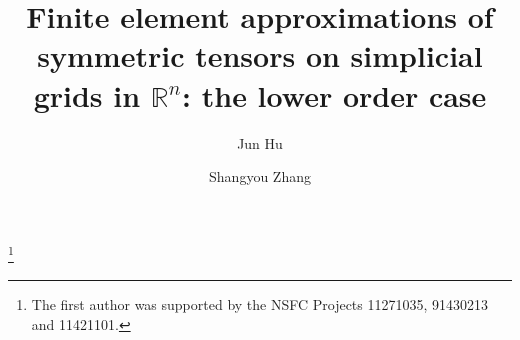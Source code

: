 \documentclass{amsart}
\numberwithin{table}{section}
\numberwithin{figure}{section}
\begin{document}
\newcommand{\disp}{\displaystyle}
\newcommand{\eps}{\varepsilon}
\newcommand{\To}{\longrightarrow}
\newcommand{\C}{\mathcal{C}}
\newcommand{\K}{\mathcal{K}}
\newcommand{\T}{\mathcal{T}}
\newcommand{\bq}{\begin{equation}}
\newcommand{\eq}{\end{equation}}
\long{}
\comments{ }

\title[Finite element  approximations]{Finite element  approximations of symmetric tensors on simplicial grids in $\mathbb{R}^n$: the lower order case
    }
\date{}

\author {Jun Hu}
\address{LMAM and School of Mathematical Sciences, Peking University,
  Beijing 100871, P. R. China.  hujun@math.pku.edu.cn}


\author {Shangyou Zhang}
\address{Department of Mathematical Sciences, University of Delaware,
    Newark, DE 19716, USA.  szhang@udel.edu }

\thanks{The first author was supported by  the NSFC Projects 11271035,  91430213 and 11421101.}
\end{document}
